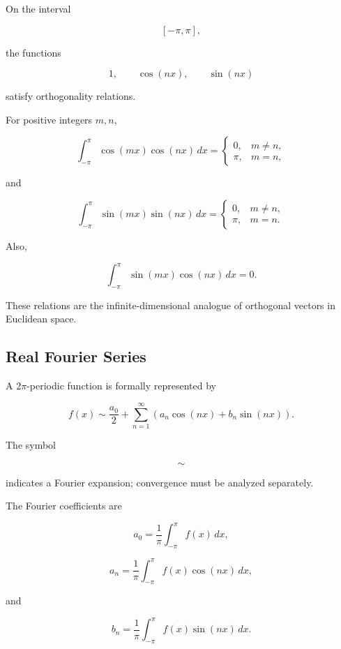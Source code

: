 On the interval

\[
[-\pi,\pi],
\]

the functions

\[
1,
\qquad
\cos(nx),
\qquad
\sin(nx)
\]

satisfy orthogonality relations.

For positive integers \(m,n\),

\[
\boxed{
\int_{-\pi}^{\pi}
\cos(mx)\cos(nx)\,dx
=
\begin{cases}
0, & m\neq n,\\
\pi, & m=n,
\end{cases}
}
\]

and

\[
\boxed{
\int_{-\pi}^{\pi}
\sin(mx)\sin(nx)\,dx
=
\begin{cases}
0, & m\neq n,\\
\pi, & m=n.
\end{cases}
}
\]

Also,

\[
\boxed{
\int_{-\pi}^{\pi}
\sin(mx)\cos(nx)\,dx
=
0.
}
\]

These relations are the infinite-dimensional analogue of orthogonal
vectors in Euclidean space.

\subsection{Real Fourier Series}
\label{subsec:real-fourier-series}

A \(2\pi\)-periodic function is formally represented by

\[
\boxed{
f(x)
\sim
\frac{a_0}{2}
+
\sum_{n=1}^{\infty}
\left(
a_n\cos(nx)
+
b_n\sin(nx)
\right).
}
\]

The symbol

\[
\sim
\]

indicates a Fourier expansion; convergence must be analyzed separately.

The Fourier coefficients are

\[
\boxed{
a_0
=
\frac{1}{\pi}
\int_{-\pi}^{\pi}f(x)\,dx,
}
\]

\[
\boxed{
a_n
=
\frac{1}{\pi}
\int_{-\pi}^{\pi}
f(x)\cos(nx)\,dx,
}
\]

and

\[
\boxed{
b_n
=
\frac{1}{\pi}
\int_{-\pi}^{\pi}
f(x)\sin(nx)\,dx.
}
\]

